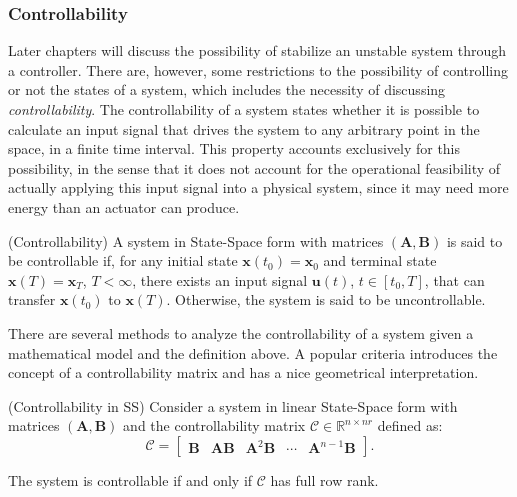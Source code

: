 \documentclass[a4paper,11pt]{book}
\numberwithin{figure}{chapter}
\numberwithin{equation}{chapter}
\numberwithin{table}{chapter}
\newtheorem{theorem}{Theorem}[chapter]
\theoremstyle{definition}
\newtheorem{definition}{Definition}[chapter]
\newcounter{boxed-theorem}
\newenvironment{boxed-theorem}[1]
{\colorlet{shadecolor}{pastelBlue2!5} \begin{shaded} \begin{theorem}{#1}}
{\end{theorem} \end{shaded}}
\newcounter{boxed-lemma}
\newcounter{boxed-definition}
\newenvironment{boxed-definition}[1]
{\colorlet{shadecolor}{pastelYellow!15} \begin{shaded} \begin{definition}{#1}}
{\end{definition} \end{shaded}}
\newcounter{boxed-example}
\begin{document}
\subsubsection{Controllability}

Later chapters will discuss the possibility of stabilize an unstable system through a controller. There are, however, some restrictions to the possibility of controlling or not the states of a system, which includes the necessity of discussing \textit{controllability}. The controllability of a system states whether it is possible to calculate an input signal that drives the system to any arbitrary point in the space, in a finite time interval. This property accounts exclusively for this possibility, in the sense that it does not account for the operational feasibility of actually applying this input signal into a physical system, since it may need more energy than an actuator can produce. 

\begin{boxed-definition}{(Controllability)}
    A system in State-Space form with matrices $(\bm{A}, \bm{B})$ is said to be controllable if, for any initial state $\bm{x}(t_0) = \bm{x}_0$ and terminal state $\bm{x}(T) = \bm{x}_T$, $T < \infty$, there exists an input signal $\bm{u}(t)$, $t \in [t_0, T]$, that can transfer $\bm{x}(t_0)$ to $\bm{x}(T)$. Otherwise, the system is said to be uncontrollable. 
\end{boxed-definition}

There are several methods to analyze the controllability of a system given a mathematical model and the definition above. A popular criteria introduces the concept of a controllability matrix and has a nice geometrical interpretation.

\begin{boxed-theorem}{(Controllability in SS)}
    Consider a system in linear State-Space form with matrices $(\bm{A}, \bm{B})$ and the controllability matrix $\bm{\mathcal{C}} \in \mathbb{R}^{n \times nr}$ defined as:
    \begin{equation}
        \bm{\mathcal{C}} = \begin{bmatrix} \bm{B} & \bm{A} \bm{B} & \bm{A}^2 \bm{B} & \cdots & \bm{A}^{n-1} \bm{B} \end{bmatrix}
    .\end{equation}
    
    The system is controllable if and only if $\bm{\mathcal{C}}$ has full row rank.
\end{boxed-theorem}   
\end{document}
